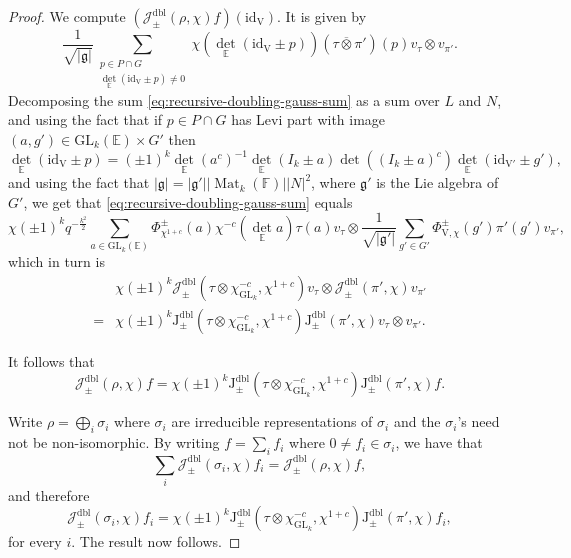 \documentclass[12pt, reqno]{amsart}
\theoremstyle{definition}
\theoremstyle{definition}
\theoremstyle{definition}
\newcommand{\detQuadratic}{{\det}_{\quadraticExtension}}
\newcommand{\idmap}{\mathrm{id}}
\newcommand{\sizeof}[1]{\left|#1\right|}
\newcommand{\hermitianSpace}{\mathrm{V}}
\newcommand{\involution}[1]{#1^{c}}
\newcommand{\minusInvolution}[1]{#1^{-c}}
\newcommand{\involutionPlusOne}[1]{#1^{1+c}}
\newcommand{\IdentityMatrix}[1]{I_{#1}}
\newcommand{\GL}{\mathrm{GL}}
\newcommand{\finiteField}{\mathbb{F}}
\newcommand{\quadraticExtension}{\mathbb{E}}
\newcommand{\squareMatrix}{\operatorname{Mat}}
\newcommand{\dblJacobiSum}[2]{\mathcal{J}_{\pm}^{\mathrm{dbl}}\left(#1, #2\right)}
\newcommand{\genJacobiKernel}[1]{\Phi^{\pm}_{#1}}
\newcommand{\genHermitianJacobiKernel}[2]{\Phi^{\pm}_{#1,#2}}
\newcommand{\dblJacobiSumScalar}[2]{\mathrm{J}_{\pm}^{\mathrm{dbl}}\left(#1, #2\right)}
\newcommand{\lieAlgebra}{\mathfrak{g}}
\begin{document}
\begin{proof}
	We compute $\left(\dblJacobiSum{\rho}{\chi} f\right)\left(\idmap_{\hermitianSpace}\right)$. It is given by
	\begin{equation}\label{eq:recursive-doubling-gauss-sum}
		\frac{1}{\sqrt{\sizeof{\lieAlgebra}}} \sum_{\substack{p \in P \cap G\\
				\detQuadratic\left(\idmap_{\hermitianSpace}\pm p\right) \ne 0}} \chi\left(\detQuadratic\left(\idmap_{\hermitianSpace} \pm p\right)\right) \left(\tau \overline{\otimes} \pi'\right)\left(p\right) v_{\tau} \otimes v_{\pi'}.
	\end{equation}
	Decomposing the sum \eqref{eq:recursive-doubling-gauss-sum} as a sum over $L$ and $N$, and using the fact that if $p \in P \cap G$ has Levi part with image $\left(a, g'\right) \in \GL_k\left(\quadraticExtension\right) \times G'$ then $$\detQuadratic\left(\idmap_{\hermitianSpace} \pm p\right) = \left(\pm 1\right)^k \detQuadratic\left(\involution{a}\right)^{-1}\detQuadratic\left(\IdentityMatrix{k} \pm a\right) \det\left(\involution{\left(\IdentityMatrix{k} \pm a\right)}\right) \detQuadratic\left(\idmap_{\hermitianSpace'} \pm g'\right),$$
	and using the fact that $\sizeof{\lieAlgebra} = \sizeof{\lieAlgebra'} \sizeof{\squareMatrix_k\left(\finiteField\right)} \sizeof{N}^2$, where $\lieAlgebra'$ is the Lie algebra of $G'$,
	we get that \eqref{eq:recursive-doubling-gauss-sum} equals
	\begin{equation}
		\chi\left(\pm 1\right)^k q^{-\frac{k^2}{2}} \sum_{a \in \GL_k\left(\quadraticExtension\right)} \genJacobiKernel{\involutionPlusOne{\chi}}\left(a\right) \minusInvolution{\chi}\left(\detQuadratic a\right) \tau\left(a\right) v_{\tau} \otimes \frac{1}{\sqrt{\sizeof{\lieAlgebra'}}} \sum_{g' \in G'} \genHermitianJacobiKernel{\hermitianSpace}{\chi}\left(g'\right) \pi'\left(g'\right) v_{\pi'},
	\end{equation}
	which in turn is
	\begin{align*}
		&\chi\left(\pm 1\right)^k \dblJacobiSum{\tau \otimes \minusInvolution{\chi_{\GL_k}}}{\involutionPlusOne{\chi}} v_{\tau} \otimes \dblJacobiSum{\pi'}{\chi} v_{\pi'}\\
		=& \chi\left(\pm 1\right)^k\dblJacobiSumScalar{\tau \otimes \minusInvolution{\chi_{\GL_k}}}{\involutionPlusOne{\chi}} \dblJacobiSumScalar{\pi'}{\chi} v_{\tau} \otimes v_{\pi'}.
	\end{align*}
	
	It follows that $$\dblJacobiSum{\rho}{\chi} f = \chi\left(\pm 1\right)^k\dblJacobiSumScalar{\tau \otimes \minusInvolution{\chi_{\GL_k}}}{\involutionPlusOne{\chi}} \dblJacobiSumScalar{\pi'}{\chi} f.$$
	
	Write $\rho = \bigoplus_i \sigma_i$ where $\sigma_i$ are irreducible representations of $\sigma_i$ and the $\sigma_i$'s need not be non-isomorphic. By writing $f = \sum_{i} f_i$ where $0 \ne f_i \in \sigma_i$, we have that $$\sum_i \dblJacobiSum{\sigma_i}{\chi} f_i = \dblJacobiSum{\rho}{\chi} f,$$
	and therefore $$\dblJacobiSum{\sigma_i}{\chi} f_i = \chi\left(\pm 1\right)^k\dblJacobiSumScalar{\tau \otimes \minusInvolution{\chi_{\GL_k}}}{\involutionPlusOne{\chi}} \dblJacobiSumScalar{\pi'}{\chi} f_i,$$
	for every $i$. The result now follows.
\end{proof}
\end{document}
